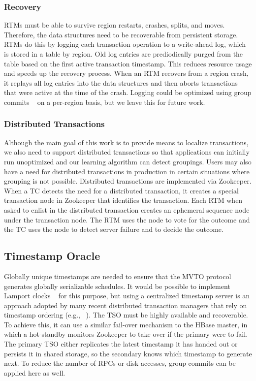 \documentclass[10pt,final,journal]{IEEEtran}
\begin{document}
\subsubsection{Recovery}
RTMs must be able to survive region restarts, crashes, splits, and moves. Therefore, the data structures need to be recoverable from persistent storage. RTMs do this by logging each transaction operation to a write-ahead log, which is stored in a table by region. Old log entries are prediodically purged from the table based on the first active transaction timestamp. This reduces resource usage and speeds up the recovery process. When an RTM recovers from a region crash, it replays all log entries into the data structures and then aborts transactions that were active at the time of the crash. Logging could be optimized using group commits ~\cite{Weikum:2001:TIS} on a per-region basis, but we leave this for future work.

\subsubsection{Distributed Transactions}
Although the main goal of this work is to provide means to localize transactions, we also need to support distributed transactions so that applications can initially run unoptimized and our learning algorithm can detect groupings. Users may also have a need for distributed transactions in production in certain situations where grouping is not possible. Distributed transactions are implemented via Zookeeper. When a TC detects the need for a distributed transaction, it creates a special transaction node in Zookeeper that identifies the transaction. Each RTM when asked to enlist in the distributed transaction creates an ephemeral sequence node under the transaction node. The RTM uses the node to vote for the outcome and the TC uses the node to detect server failure and to decide the outcome.

\subsection{Timestamp Oracle}
Globally unique timestamps are needed to ensure that the MVTO protocol generates globally serializable schedules. It would be possible to implement Lamport clocks ~\cite{Lamport:1978:TCO:359545.359563} for this purpose, but using a centralized timestamp server is an approach adopted by many recent distributed transaction managers that rely on timestamp ordering (e.g., ~\cite{Peng:2010:LIP:1924943.1924961, Wei:2011:5740834}). The TSO must be highly available and recoverable. To achieve this, it can use a similar fail-over mechanism to the HBase master, in which a hot-standby monitors Zookeeper to take over if the primary were to fail. The primary TSO either replicates the latest timestamp it has handed out or persists it in shared storage, so the secondary knows which timestamp to generate next. To reduce the number of RPCs or disk accesses, group commits can be applied here as well.
\end{document}
